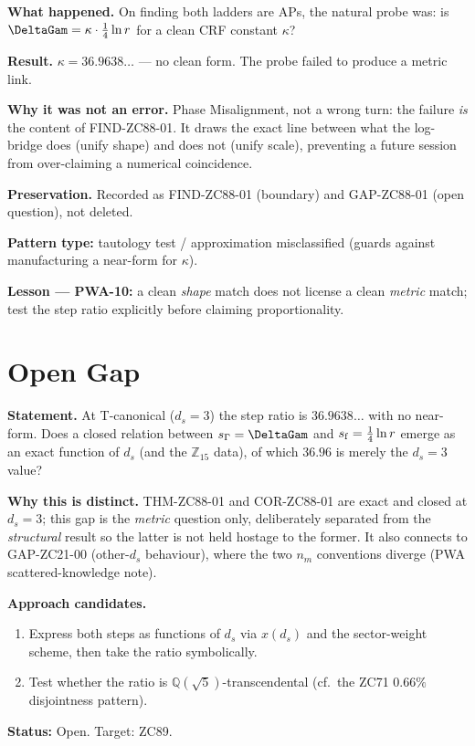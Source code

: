\documentclass[12pt, a4paper]{article}
\begin{document}
\begin{derivedbox}[title={PM-ZC88-01: ``The Two Steps Are Proportional''
  --- Probe Refuted (Failure Stance)}]
\textbf{What happened.}
On finding both ladders are APs, the natural probe was: is
$\DeltaGam=\kappa\cdot\tfrac14\ln r$ for a clean CRF constant $\kappa$?

\textbf{Result.}
$\kappa=36.9638\ldots$ --- no clean form. The probe failed to produce a
metric link.

\textbf{Why it was not an error.}
Phase Misalignment, not a wrong turn: the failure \emph{is} the content of
FIND-ZC88-01. It draws the exact line between what the log-bridge does
(unify shape) and does not (unify scale), preventing a future session from
over-claiming a numerical coincidence.

\textbf{Preservation.}
Recorded as FIND-ZC88-01 (boundary) and GAP-ZC88-01 (open question), not
deleted.

\textbf{Pattern type:} tautology test / approximation misclassified
(guards against manufacturing a near-form for $\kappa$).

\textbf{Lesson --- PWA-10:} a clean \emph{shape} match does not license a
clean \emph{metric} match; test the step ratio explicitly before claiming
proportionality.
\end{derivedbox}

\section{Open Gap}
\label{sec:gap-zc88}

\begin{openqbox}[title={GAP-ZC88-01: Is There a $d_s$-General Exact
  Step-Relation? (Priority~3; ZC89 target)}]
\textbf{Statement.}
At T-canonical ($d_s=3$) the step ratio is $36.9638\ldots$ with no
near-form. Does a closed relation between $s_\Gamma=\DeltaGam$ and
$s_{\rm f}=\tfrac14\ln r$ emerge as an exact function of $d_s$ (and the
$\mathbb{Z}_{15}$ data), of which $36.96$ is merely the $d_s=3$ value?

\textbf{Why this is distinct.}
THM-ZC88-01 and COR-ZC88-01 are exact and closed at $d_s=3$; this gap is
the \emph{metric} question only, deliberately separated from the
\emph{structural} result so the latter is not held hostage to the former.
It also connects to GAP-ZC21-00 (other-$d_s$ behaviour), where the two
$n_m$ conventions diverge (PWA scattered-knowledge note).

\textbf{Approach candidates.}
\begin{enumerate}[leftmargin=2em, noitemsep]
  \item Express both steps as functions of $d_s$ via $x(d_s)$ and the
    sector-weight scheme, then take the ratio symbolically.
  \item Test whether the ratio is $\mathbb{Q}(\sqrt5)$-transcendental
    (cf.\ the ZC71 $0.66\%$ disjointness pattern).
\end{enumerate}
\textbf{Status:} Open. Target: ZC89.
\end{openqbox}
\end{document}
